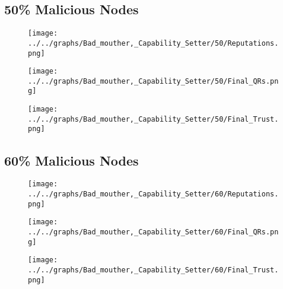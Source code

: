 \begin{minipage}[t]{0.49\columnwidth}
\subsection*{50\% Malicious Nodes}
    \begin{figure}[H]
        \centering
        \texttt{[image: ../../graphs/Bad\_mouther,\_Capability\_Setter/50/Reputations.png]}
    \end{figure}
    \begin{figure}[H]
        \centering
        \texttt{[image: ../../graphs/Bad\_mouther,\_Capability\_Setter/50/Final\_QRs.png]}
    \end{figure}
\end{minipage}
\begin{minipage}[t]{0.49\columnwidth}
    \begin{figure}[H]
        \centering
        \texttt{[image: ../../graphs/Bad\_mouther,\_Capability\_Setter/50/Final\_Trust.png]}
    \end{figure}
\end{minipage}

\begin{minipage}[t]{0.49\columnwidth}
\subsection*{60\% Malicious Nodes}
    \begin{figure}[H]
        \centering
        \texttt{[image: ../../graphs/Bad\_mouther,\_Capability\_Setter/60/Reputations.png]}
    \end{figure}
    \begin{figure}[H]
        \centering
        \texttt{[image: ../../graphs/Bad\_mouther,\_Capability\_Setter/60/Final\_QRs.png]}
    \end{figure}
\end{minipage}
\begin{minipage}[t]{0.49\columnwidth}
    \begin{figure}[H]
        \centering
        \texttt{[image: ../../graphs/Bad\_mouther,\_Capability\_Setter/60/Final\_Trust.png]}
    \end{figure}
\end{minipage}

